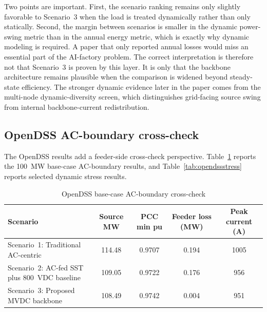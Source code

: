 \documentclass[11pt]{article}
\begin{document}
Two points are important. First, the scenario ranking remains only slightly favorable to Scenario~3 when the load is treated dynamically rather than only statically. Second, the margin between scenarios is smaller in the dynamic power-swing metric than in the annual energy metric, which is exactly why dynamic modeling is required. A paper that only reported annual losses would miss an essential part of the AI-factory problem. The correct interpretation is therefore not that Scenario~3 is proven by this layer. It is only that the backbone architecture remains plausible when the comparison is widened beyond steady-state efficiency. The stronger dynamic evidence later in the paper comes from the multi-node dynamic-diversity screen, which distinguishes grid-facing source swing from internal backbone-current redistribution.

\subsection{OpenDSS AC-boundary cross-check}
The OpenDSS results add a feeder-side cross-check perspective. Table~\ref{tab:opendssbase} reports the 100~MW base-case AC-boundary results, and Table~\ref{tab:opendssstress} reports selected dynamic stress results.

\begin{table}[t]
    \centering
    \caption{OpenDSS base-case AC-boundary cross-check}
    \label{tab:opendssbase}
    \begin{tabular}{p{2.25in}cccc}
        \toprule
        Scenario & Source MW & PCC min pu & Feeder loss (MW) & Peak current (A) \\
        \midrule
        Scenario~1: Traditional AC-centric & 114.48 & 0.9707 & 0.194 & 1005 \\
        Scenario~2: AC-fed SST plus 800~VDC baseline & 109.05 & 0.9722 & 0.176 & 956 \\
        Scenario~3: Proposed MVDC backbone & 108.49 & 0.9742 & 0.004 & 951 \\
        \bottomrule
    \end{tabular}
\end{table}
\end{document}
